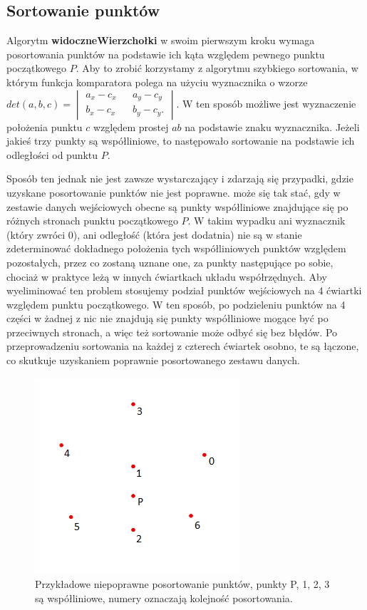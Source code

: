 \documentclass{article}
\begin{document}
\subsection{Sortowanie punktów}

\qquad Algorytm \textbf{widoczneWierzchołki} w swoim pierwszym kroku wymaga posortowania punktów na podstawie ich kąta względem pewnego punktu początkowego $P$. Aby to zrobić korzystamy z algorytmu szybkiego sortowania, w którym funkcja komparatora polega na użyciu wyznacznika o wzorze 
$det(a, b, c) = \begin{vmatrix}
a_x - c_x && a_y - c_y \\ b_x - c_x && b_y - c_y.
\end{vmatrix}$.
W ten sposób możliwe jest wyznaczenie położenia punktu $c$ względem prostej $ab$ na podstawie znaku wyznacznika. Jeżeli jakieś trzy punkty są współliniowe, to następowało sortowanie na podstawie ich odległości od punktu $P$.

\noindent \qquad Sposób ten jednak nie jest zawsze wystarczający i zdarzają się przypadki, gdzie uzyskane posortowanie punktów nie jest poprawne. może się tak stać, gdy w zestawie danych wejściowych obecne są punkty współliniowe znajdujące się po różnych stronach punktu początkowego $P$. W takim wypadku ani wyznacznik (który zwróci 0), ani odległość (która jest dodatnia) nie są w stanie zdeterminować dokładnego położenia tych współliniowych punktów względem pozostałych, przez co zostaną uznane one, za punkty następujące po sobie, chociaż w praktyce leżą w innych ćwiartkach układu współrzędnych. Aby wyeliminować ten problem stosujemy podział punktów wejściowych na 4 ćwiartki względem punktu początkowego. W ten sposób, po podzieleniu punktów na 4 części w żadnej z nic nie znajdują się punkty współliniowe mogące być po przeciwnych stronach, a więc też sortowanie może odbyć się bez błędów. Po przeprowadzeniu sortowania na każdej z czterech ćwiartek osobno, te są łączone, co skutkuje uzyskaniem poprawnie posortowanego zestawu danych. 

\begin{figure}[ht]
\centering
\caption{\centering Przykładowe niepoprawne posortowanie punktów, punkty P, 1, 2, 3 są współliniowe, numery oznaczają kolejność posortowania.}
\includegraphics[width=0.4\linewidth]{rys3.png}
\end{figure} 
\end{document}
